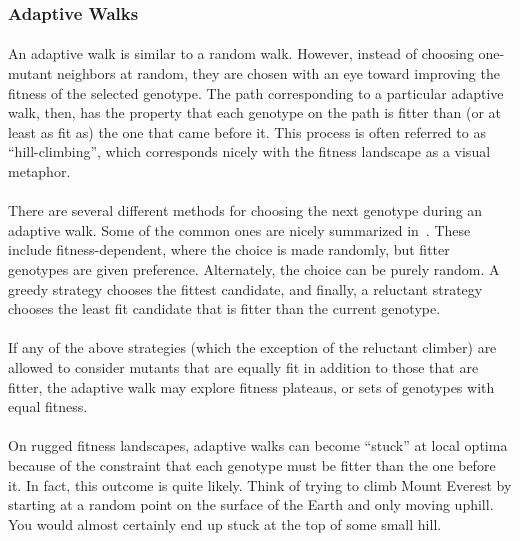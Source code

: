 \documentclass[12pt,letterpaper,titlepage]{article}
\begin{document}
\subsubsection{Adaptive Walks}

\paragraph{}
An adaptive walk is similar to a random walk. However, instead of choosing
one-mutant neighbors at random, they are chosen with an eye toward improving
the fitness of the selected genotype. The path corresponding to a particular
adaptive walk, then, has the property that each genotype on the path is fitter
than (or at least as fit as) the one that came before it. This process is often
referred to as ``hill-climbing'', which corresponds nicely with the fitness
landscape as a visual metaphor.

\paragraph{}
There are several different methods for choosing the next genotype during an
adaptive walk. Some of the common ones are nicely summarized
in~\cite{Nowak2015}. These include fitness-dependent, where the choice is made
randomly, but fitter genotypes are given preference. Alternately, the choice
can be purely random. A greedy strategy chooses the fittest candidate, and
finally, a reluctant strategy chooses the least fit candidate that is fitter
than the current genotype.

\paragraph{}
If any of the above strategies (which the exception of the reluctant climber)
are allowed to consider mutants that are equally fit in addition to those that
are fitter, the adaptive walk may explore fitness plateaus, or sets of
genotypes with equal fitness.

\paragraph{}
On rugged fitness landscapes, adaptive walks can become ``stuck'' at local
optima because of the constraint that each genotype must be fitter than the one
before it. In fact, this outcome is quite likely. Think of trying to climb
Mount Everest by starting at a random point on the surface of the Earth and
only moving uphill. You would almost certainly end up stuck at the top of some
small hill.
\end{document}
